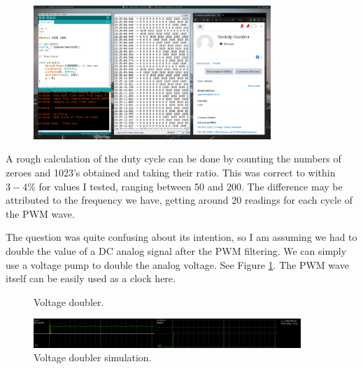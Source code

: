 \begin{arabicparts}
    \begin{figure}[ht]
        \centering
        \includegraphics[width=0.8\textwidth]{fig/pwmproof.png}
    \end{figure}

    A rough calculation of the duty cycle can be done by counting the numbers of zeroes and 
    1023's obtained and taking their ratio. This was correct to within $3-4\%$ for values I tested,
    ranging between 50 and 200. The difference may be attributed to the frequency we have, getting
    around 20 readings for each cycle of the PWM wave.

    \questionpart
    The question was quite confusing about its intention, so I am assuming we had to 
    double the value of a DC analog signal after the PWM filtering.
    We can simply use a voltage pump to double the analog voltage. See Figure \ref{fig:voltmul}.
    The PWM wave itself can be easily used as a clock here.

    \begin{figure}[ht]
        \centering
        \scalebox{0.8}{}
        \caption{Voltage doubler.}
        \label{fig:voltmul}        
    \end{figure}

    \begin{figure}[ht]
        \centering
        \includegraphics[width=0.9\textwidth]{fig/voldubsim.png}
        \caption{Voltage doubler simulation.}
        \label{fig:voltmulsim}                
    \end{figure}


\end{arabicparts}